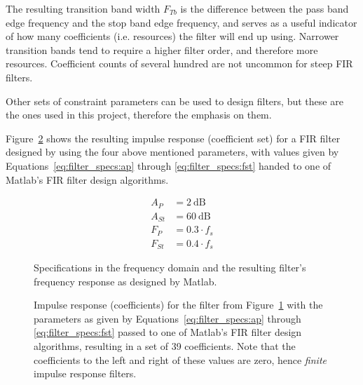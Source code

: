 The resulting  transition band  width $F_{Tb}$ is  the difference  between the
pass band  edge frequency and  the stop band edge  frequency, and serves  as a
useful indicator of how many coefficients (i.e. resources) the filter will end
up using. Narrower transition bands tend to require a higher filter order, and
therefore  more  resources. Coefficient  counts  of several  hundred  are  not
uncommon for steep FIR filters.

Other sets of  constraint parameters can be used to  design filters, but these
are the ones used in this project, therefore the emphasis on them.

Figure~\ref{fig:filter_specs:coefs}  shows  the   resulting  impulse  response
(coefficient  set)  for  a  FIR  filter  designed  by  using  the  four  above
mentioned parameters, with  values given by Equations~\ref{eq:filter_specs:ap}
through \ref{eq:filter_specs:fst} handed to one  of Matlab's FIR filter design
algorithms.

\begin{align}
    A_P    &= \SI{2}{\dB}   \label{eq:filter_specs:ap}\\
    A_{St} &= \SI{60}{\dB}  \label{eq:filter_specs:ast}\\
    F_P    &= 0.3 \cdot f_s \label{eq:filter_specs:fp}\\
    F_{St} &= 0.4 \cdot f_s \label{eq:filter_specs:fst}
\end{align}

\begin{figure}
    \centering
    
    \caption[Specifying FIR Filter Constraints]{
        Specifications in the frequency domain and the resulting filter's
        frequency response as designed by Matlab.%
    }
    \label{fig:filter_specs:freqResponse}
\end{figure}

\begin{figure}
    \centering
    
    \caption[Impulse Response of a FIR Filter]{
        Impulse    response    (coefficients)     for    the    filter    from
        Figure~\ref{fig:filter_specs:freqResponse}    with   the    parameters
        as     given     by     Equations~\ref{eq:filter_specs:ap}     through
        \ref{eq:filter_specs:fst}    passed   to    one   of    Matlab's   FIR
        filter   design   algorithms,  resulting   in   a   set  of   \num{39}
        coefficients.\protect\newline
        Note that the  coefficients to the left and right  of these values are
        zero, hence \emph{finite} impulse response filters.%
    }
    \label{fig:filter_specs:coefs}
\end{figure}


